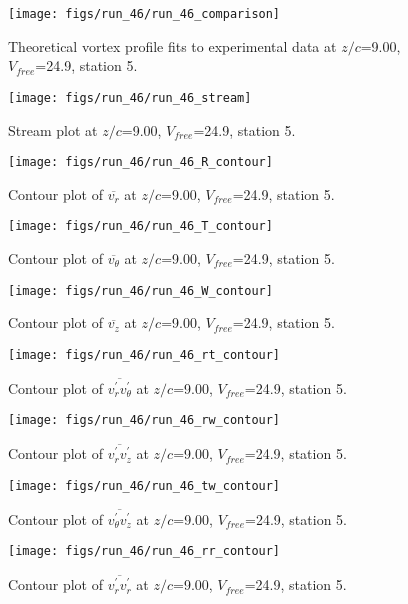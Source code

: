 \begin{figure}[H]
\centering
\texttt{[image: figs/run\_46/run\_46\_comparison]}
\caption{Theoretical vortex profile fits to experimental data at $z/c$=9.00, $V_{free}$=24.9, station 5.}
\end{figure}


\begin{figure}[H]
\centering
\texttt{[image: figs/run\_46/run\_46\_stream]}
\caption{Stream plot at $z/c$=9.00, $V_{free}$=24.9, station 5.}
\end{figure}


\begin{figure}[H]
\centering
\texttt{[image: figs/run\_46/run\_46\_R\_contour]}
\caption{Contour plot of $\overline{v_{r}}$ at $z/c$=9.00, $V_{free}$=24.9, station 5.}
\end{figure}


\begin{figure}[H]
\centering
\texttt{[image: figs/run\_46/run\_46\_T\_contour]}
\caption{Contour plot of $\overline{v_{\theta}}$ at $z/c$=9.00, $V_{free}$=24.9, station 5.}
\end{figure}


\begin{figure}[H]
\centering
\texttt{[image: figs/run\_46/run\_46\_W\_contour]}
\caption{Contour plot of $\overline{v_{z}}$ at $z/c$=9.00, $V_{free}$=24.9, station 5.}
\end{figure}


\begin{figure}[H]
\centering
\texttt{[image: figs/run\_46/run\_46\_rt\_contour]}
\caption{Contour plot of $\overline{v_{r}^{\prime} v_{\theta}^{\prime}}$ at $z/c$=9.00, $V_{free}$=24.9, station 5.}
\end{figure}


\begin{figure}[H]
\centering
\texttt{[image: figs/run\_46/run\_46\_rw\_contour]}
\caption{Contour plot of $\overline{v_{r}^{\prime} v_{z}^{\prime}}$ at $z/c$=9.00, $V_{free}$=24.9, station 5.}
\end{figure}


\begin{figure}[H]
\centering
\texttt{[image: figs/run\_46/run\_46\_tw\_contour]}
\caption{Contour plot of $\overline{v_{\theta}^{\prime} v_{z}^{\prime}}$ at $z/c$=9.00, $V_{free}$=24.9, station 5.}
\end{figure}


\begin{figure}[H]
\centering
\texttt{[image: figs/run\_46/run\_46\_rr\_contour]}
\caption{Contour plot of $\overline{v_{r}^{\prime} v_{r}^{\prime}}$ at $z/c$=9.00, $V_{free}$=24.9, station 5.}
\end{figure}


